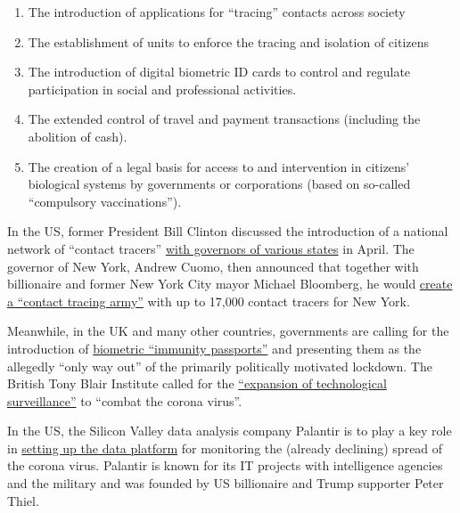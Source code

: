 \begin{enumerate}
\def\labelenumi{\arabic{enumi}.}
\tightlist
\item
  The introduction of applications for ``tracing'' contacts across
  society
\item
  The establishment of units to enforce the tracing and isolation of
  citizens
\item
  The introduction of digital biometric ID cards to control and regulate
  participation in social and professional activities.
\item
  The extended control of travel and payment transactions (including the
  abolition of cash).
\item
  The creation of a legal basis for access to and intervention in
  citizens' biological systems by governments or corporations (based on
  so-called ``compulsory vaccinations'').
\end{enumerate}

In the US, former President Bill Clinton discussed the introduction of a
national network of ``contact tracers''
\href{https://www.youtube.com/watch?v=-Ug9XHT9JQQ}{with governors of
various states} in April. The governor of New York, Andrew Cuomo, then
announced that together with billionaire and former New York City mayor
Michael Bloomberg, he would
\href{https://www.cbsnews.com/news/contact-tracing-new-york-cuomo-plan/}{create
a ``contact tracing army''} with up to 17,000 contact tracers for New
York.

Meanwhile, in the UK and many other countries, governments are calling
for the introduction of
\href{https://www.msn.com/en-us/money/news/the-uk-just-published-blueprints-for-covid-19-immunity-passports-a-controversial-potential-route-out-of-lockdown/ar-BB13qr8L}{biometric
``immunity passports''} and presenting them as the allegedly ``only way
out'' of the primarily politically motivated lockdown. The British Tony
Blair Institute called for the
\href{https://www.theguardian.com/world/2020/apr/24/surveillance-a-price-worth-paying-to-beat-coronavirus-says-blair-thinktank}{``expansion
of technological surveillance''} to ``combat the corona virus''.

In the US, the Silicon Valley data analysis company Palantir is to play
a key role in
\href{https://www.msn.com/en-us/news/us/team-trump-turns-to-peter-thiel-s-palantir-to-track-virus/ar-BB130qfE}{setting
up the data platform} for monitoring the (already declining) spread of
the corona virus. Palantir is known for its IT projects with
intelligence agencies and the military and was founded by US billionaire
and Trump supporter Peter Thiel.

